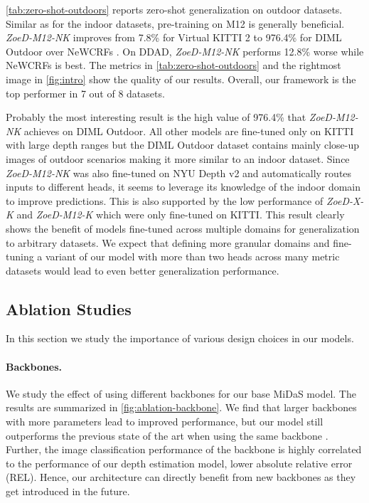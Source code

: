 \documentclass[10pt,twocolumn,letterpaper]{article}
\begin{document}
\cref{tab:zero-shot-outdoors} reports zero-shot generalization on outdoor datasets. Similar as for the indoor datasets, pre-training on M12 is generally beneficial. \textit{ZoeD-M12-NK} improves from 7.8\% for Virtual KITTI 2 to 976.4\% for DIML Outdoor over NeWCRFs \cite{yuan2022new}. On DDAD, \textit{ZoeD-M12-NK} performs 12.8\% worse while NeWCRFs \cite{yuan2022new} is best.
The metrics in \cref{tab:zero-shot-outdoors} and the rightmost image in \cref{fig:intro} show the quality of our results. 
Overall, our framework is the top performer in 7 out of 8 datasets.

Probably the most interesting result is the high  value of 976.4\% that \textit{ZoeD-M12-NK} achieves on DIML Outdoor. All other models are fine-tuned only on KITTI with large depth ranges but the DIML Outdoor dataset contains mainly close-up images of outdoor scenarios making it more similar to an indoor dataset. Since \textit{ZoeD-M12-NK} was also fine-tuned on NYU Depth v2 and automatically routes inputs to different heads, it seems to leverage its knowledge of the indoor domain to improve predictions. This is also supported by the low performance of \textit{ZoeD-X-K} and \textit{ZoeD-M12-K} which were only fine-tuned on KITTI. This result clearly shows the benefit of models fine-tuned across multiple domains for generalization to arbitrary datasets. We expect that defining more granular domains and fine-tuning a variant of our model with more than two heads across many metric datasets would lead to even better generalization performance.

\subsection{Ablation Studies}
\label{sec:ablation}
In this section we study the importance of various design choices in our models. 


\paragraph{Backbones.} We study the effect of using different backbones for our base MiDaS model. The results are summarized in \cref{fig:ablation-backbone}. We find that larger backbones with more parameters lead to improved performance, but our model still outperforms the previous state of the art when using the same backbone \cite{liu2021swin}. Further, the image classification performance of the backbone is highly correlated to the performance of our depth estimation model, \ie lower absolute relative error (REL).  
Hence, our architecture can directly benefit from new backbones as they get introduced in the future.
\end{document}
